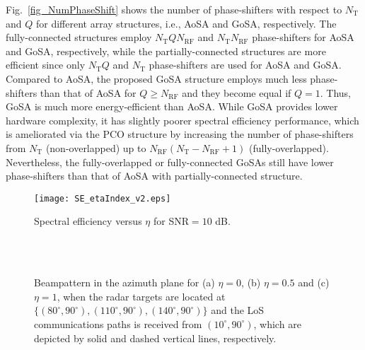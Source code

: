 \documentclass[journal,10pt]{IEEEtran}
\begin{document}
	
	Fig.~\ref{fig_NumPhaseShift} shows the number of phase-shifters with respect to $N_\mathrm{T}$ and $Q$ for different array structures, i.e., AoSA and GoSA, respectively. The fully-connected structures employ $N_\mathrm{T}QN_\mathrm{RF}$ and $N_\mathrm{T}N_\mathrm{RF}$ phase-shifters for AoSA and GoSA, respectively, while  the partially-connected structures are more efficient since only $N_\mathrm{T}Q$ and $N_\mathrm{T}$ phase-shifters are used for AoSA and GoSA. Compared to AoSA, the proposed GoSA structure employs much less phase-shifters than that of AoSA for $Q \geq N_\mathrm{RF}$ and they become equal if $Q =1$. Thus, GoSA is much more energy-efficient than AoSA.  While GoSA provides lower hardware complexity, it has  slightly poorer spectral efficiency performance, which is ameliorated via the PCO structure by increasing the number of phase-shifters from $N_\mathrm{T}$ (non-overlapped) up to $N_\mathrm{RF}(N_\mathrm{T} - N_\mathrm{RF}+1)$ (fully-overlapped). Nevertheless, the fully-overlapped or fully-connected GoSAs still have lower phase-shifters than that of AoSA with partially-connected structure.
	
	
	
	
	\begin{figure}[t]
		\centering
		{\texttt{[image: SE\_etaIndex\_v2.eps]} } 
		\caption{\color{black}Spectral efficiency versus $\eta$ for SNR$=10$ dB. 
		}
		\label{fig_SE_eta}
	\end{figure}
	
	
	
	
	
	\begin{figure}[t]
		\centering
		 \\
		 \\
		\caption{\color{black}Beampattern in the azimuth plane for (a) $\eta = 0$, (b) $\eta = 0.5$ and (c) $\eta = 1$, when the radar targets are located at $\{(80^\circ,90^\circ),(110^\circ,90^\circ),(140^\circ,90^\circ)\}$ and the LoS communications paths is received from $(10^\circ,90^\circ)$, which are depicted by solid and dashed vertical lines, respectively. 
		}
		\label{fig_BP_az}
	\end{figure}
	
\end{document}
